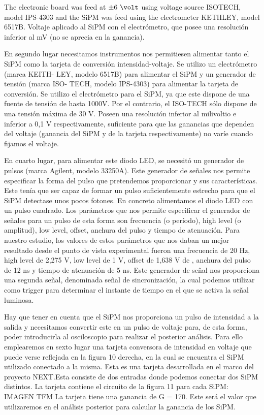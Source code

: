 The electronic board was feed at $\pm6~\volt$ using voltage source ISOTECH, model IPS-4303 \cite{} and the SiPM was feed using the electrometer KETHLEY, model 6517B. Voltaje aplicado al SiPM con el electrómetro, que posee una resolución inferior al mV (no se aprecia en la ganancia).

En segundo lugar necesitamos instrumentos nos permitiesen alimentar tanto el SiPM como
la tarjeta de conversión intensidad-voltaje. Se utilizo un electrómetro (marca KEITH-
LEY, modelo 6517B) para alimentar el SiPM y un generador de tensión (marca ISO-
TECH, modelo IPS-4303) para alimentar la tarjeta de conversión.
Se utilizo el electrómetro para el SiPM, ya que este dispone de una fuente de tensión de hasta
1000V. Por el contrario, el ISO-TECH sólo dispone de una tensión máxima de 30 V. Poseen
una resolución inferior al milivoltio e inferior a 0,1 V respectivamente, suficiente para que
las ganancias que dependen del voltaje (ganancia del SiPM y de la tarjeta respectivamente)
no varíe cuando fijamos el voltaje.

En cuarto lugar, para alimentar este diodo LED, se necesitó un generador de pulsos
(marca Agilent, modelo 33250A). Este generador de señales nos permite especificar la
forma del pulso que pretendemos proporcionar y sus características. Este tenía que ser
capaz de formar un pulso suficientemente estrecho para que el SiPM detectase unos pocos
fotones.
En concreto alimentamos el diodo LED con un pulso cuadrado. Los parámetros que nos
permite especificar el generador de señales para un pulso de esta forma son frecuencia (o
período), high level (o amplitud), low level, offset, anchura del pulso y tiempo de atenuación.
Para nuestro estudio, los valores de estos parámetros que nos daban un mejor resultado
desde el punto de vista experimental fueron una frecuencia de 20 Hz, high level de 2,275 V,
low level de 1 V, offset de 1,638 V dc , anchura del pulso de 12 ns y tiempo de atenuación
de 5 ns. Este generador de señal nos proporciona una segunda señal, denominada señal de
sincronización, la cual podemos utilizar como trigger para determinar el instante de tiempo
en el que se activa la señal luminosa.

Hay que tener en cuenta que el SiPM nos proporciona un pulso de intensidad a la salida y
necesitamos convertir este en un pulso de voltaje para, de esta forma, poder introducirla
al osciloscopio para realizar el posterior análisis. Para ello emplearemos en sexto lugar una
tarjeta conversora de intensidad en voltaje que puede verse reflejada en la figura 10
derecha, en la cual se encuentra el SiPM utilizado conectado a la misma.
Esta es una tarjeta desarrollada en el marco del proyecto NEXT.Esta consiste de dos
entradas donde podemos conectar dos SiPM distintos. La tarjeta contiene el circuito de la
figura 11 para cada SiPM:
IMAGEN TFM
La tarjeta tiene una ganancia de G = 170. Este será el valor que utilizaremos en el análisis
posterior para calcular la ganancia de los SiPM.



